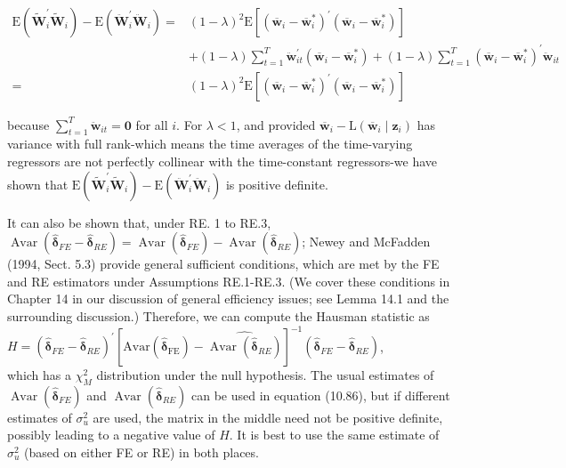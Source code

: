 \documentclass[10pt]{article}
\begin{document}
\begin{align*}
\mathrm{E}\left(\tilde{\mathbf{W}}_{i}^{\prime} \tilde{\mathbf{W}}_{i}\right)-\mathrm{E}\left(\ddot{\mathbf{W}}_{i}^{\prime} \ddot{\mathbf{W}}_{i}\right)= & (1-\lambda)^{2} \mathrm{E}\left[\left(\overline{\mathbf{w}}_{i}-\overline{\mathbf{w}}_{i}^{*}\right)^{\prime}\left(\overline{\mathbf{w}}_{i}-\overline{\mathbf{w}}_{i}^{*}\right)\right] \\
& +(1-\lambda) \sum_{t=1}^{T} \ddot{\mathbf{w}}_{i t}^{\prime}\left(\overline{\mathbf{w}}_{i}-\overline{\mathbf{w}}_{i}^{*}\right)+(1-\lambda) \sum_{t=1}^{T}\left(\overline{\mathbf{w}}_{i}-\overline{\mathbf{w}}_{i}^{*}\right)^{\prime} \ddot{\mathbf{w}}_{i t} \\
= & (1-\lambda)^{2} \mathrm{E}\left[\left(\overline{\mathbf{w}}_{i}-\overline{\mathbf{w}}_{i}^{*}\right)^{\prime}\left(\overline{\mathbf{w}}_{i}-\overline{\mathbf{w}}_{i}^{*}\right)\right] \tag{10.85}
\end{align*}


because $\sum_{t=1}^{T} \ddot{\mathbf{w}}_{i t}=\mathbf{0}$ for all $i$. For $\lambda<1$, and provided $\overline{\mathbf{w}}_{i}-\mathrm{L}\left(\overline{\mathbf{w}}_{i} \mid \mathbf{z}_{i}\right)$ has variance with full rank-which means the time averages of the time-varying regressors are not perfectly collinear with the time-constant regressors-we have shown that $\mathrm{E}\left(\tilde{\mathbf{W}}_{i}^{\prime} \tilde{\mathbf{W}}_{i}\right)-\mathrm{E}\left(\ddot{\mathbf{W}}_{i}^{\prime} \ddot{\mathbf{W}}_{i}\right)$ is positive definite.

It can also be shown that, under RE. 1 to RE.3, $\operatorname{Avar}\left(\hat{\boldsymbol{\delta}}_{F E}-\hat{\boldsymbol{\delta}}_{R E}\right)=\operatorname{Avar}\left(\hat{\boldsymbol{\delta}}_{F E}\right)- \operatorname{Avar}\left(\hat{\boldsymbol{\delta}}_{R E}\right)$; Newey and McFadden (1994, Sect. 5.3) provide general sufficient conditions, which are met by the FE and RE estimators under Assumptions RE.1-RE.3. (We cover these conditions in Chapter 14 in our discussion of general efficiency issues; see Lemma 14.1 and the surrounding discussion.) Therefore, we can compute the Hausman statistic as\\
$H=\left(\hat{\boldsymbol{\delta}}_{F E}-\hat{\boldsymbol{\delta}}_{R E}\right)^{\prime}\left[\operatorname{Avar(\hat {\boldsymbol {\delta }}_{FE})}-\widehat{\operatorname{Avar}\left(\hat{\boldsymbol{\delta}}_{R E}\right)}\right]^{-1}\left(\hat{\boldsymbol{\delta}}_{F E}-\hat{\boldsymbol{\delta}}_{R E}\right)$,\\
which has a $\chi_{M}^{2}$ distribution under the null hypothesis. The usual estimates of $\operatorname{Avar}\left(\hat{\boldsymbol{\delta}}_{F E}\right)$ and $\operatorname{Avar}\left(\hat{\boldsymbol{\delta}}_{R E}\right)$ can be used in equation (10.86), but if different estimates of $\sigma_{u}^{2}$ are used, the matrix in the middle need not be positive definite, possibly leading to a negative value of $H$. It is best to use the same estimate of $\sigma_{u}^{2}$ (based on either FE or RE) in both places.
\end{document}
